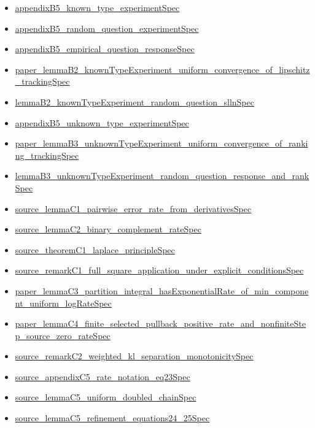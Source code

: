 \documentclass[10pt]{article}
\begin{document}
\begin{itemize}[leftmargin=1.2em]
\begin{itemize}[leftmargin=1.2em]
\item \hyperlink{source-claim-c34337b3884bb5d6}{appendixB5\_known\_type\_experimentSpec}
\item \hyperlink{source-claim-b26a46506065f742}{appendixB5\_random\_question\_experimentSpec}
\item \hyperlink{source-claim-8ccc8a8f737a5e7c}{appendixB5\_empirical\_question\_responseSpec}
\item \hyperlink{source-claim-276fd5feab006dec}{paper\_lemmaB2\_knownTypeExperiment\_uniform\_convergence\_of\_lipschitz\_trackingSpec}
\item \hyperlink{source-claim-76b42fc11ca5198e}{lemmaB2\_knownTypeExperiment\_random\_question\_sllnSpec}
\item \hyperlink{source-claim-e38b113829a05c8d}{appendixB5\_unknown\_type\_experimentSpec}
\item \hyperlink{source-claim-045f11cd1b489b98}{paper\_lemmaB3\_unknownTypeExperiment\_uniform\_convergence\_of\_ranking\_trackingSpec}
\item \hyperlink{source-claim-99b64aa08841b772}{lemmaB3\_unknownTypeExperiment\_random\_question\_response\_and\_rankSpec}
\item \hyperlink{source-claim-7ea3c8ab498f92dc}{source\_lemmaC1\_pairwise\_error\_rate\_from\_derivativesSpec}
\item \hyperlink{source-claim-5122f84bd17b3a2c}{source\_lemmaC2\_binary\_complement\_rateSpec}
\item \hyperlink{source-claim-d95b8ab740a8ceda}{source\_theoremC1\_laplace\_principleSpec}
\item \hyperlink{source-claim-16ee341855124303}{source\_remarkC1\_full\_square\_application\_under\_explicit\_conditionsSpec}
\item \hyperlink{source-claim-7529d1dedcffdbe3}{paper\_lemmaC3\_partition\_integral\_hasExponentialRate\_of\_min\_component\_uniform\_logRateSpec}
\item \hyperlink{source-claim-043c064a62132f60}{paper\_lemmaC4\_finite\_selected\_pullback\_positive\_rate\_and\_nonfiniteStep\_source\_zero\_rateSpec}
\item \hyperlink{source-claim-15e577a1127ae1d6}{source\_remarkC2\_weighted\_kl\_separation\_monotonicitySpec}
\item \hyperlink{source-claim-f9871b4133903309}{source\_appendixC5\_rate\_notation\_eq23Spec}
\item \hyperlink{source-claim-f8aedb48228e5085}{source\_lemmaC5\_uniform\_doubled\_chainSpec}
\item \hyperlink{source-claim-428f19cd38ba7b0a}{source\_lemmaC5\_refinement\_equations24\_25Spec}

\end{itemize}
\end{itemize}
\end{document}
